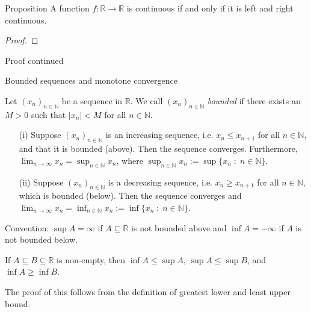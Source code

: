 \documentclass [aspectratio=169]{beamer}
\newcommand{\R}{{\mathbb{R}}}
\newcommand{\N}{{\mathbb{N}}}
\begin{document}
\begin{frame}
\begin{exampleblock}{Proposition}
 A function $f\colon \R \to \R$ is continuous if and only if it is left and right continuous. 
\end{exampleblock}
\begin{proof}
\vspace{5cm}
\end{proof}
\end{frame}


\begin{frame}
\begin{block}{Proof continued}
\vspace{4.5cm}
\end{block}
\end{frame}


\begin{frame}{Bounded sequences and monotone convergence}
\begin{definition}
Let $(x_n)_{n\in \N}$ be a sequence in $\R$. We call $(x_n)_{n\in \N}$ \emph{bounded} if there exists an $M > 0$ such that $\vert x_n\vert<M$ for all $n\in \N$.
\end{definition}

\vspace{0.5em}

\begin{theorem}
\begin{itemize}
\item[(i)] Suppose $(x_n)_{n\in \N}$ is an increasing sequence, i.e. $x_n\leq x_{n+1}$ for all $n\in \N$, and that it is bounded (above). Then the sequence converges. Furthermore, $\lim_{n\to \infty} x_n = \sup_{n\in \N} x_n$, where $\sup_{n\in \N} x_n := \sup\{x_n \; \colon \; n\in \N\}$.
\item[(ii)] Suppose $(x_n)_{n\in \N}$ is a decreasing sequence, i.e. $x_n\geq x_{n+1}$ for all $n\in \N$, which is bounded (below). Then the sequence converges and $\lim_{n\to \infty} x_n = \inf_{n\in \N} x_n := \inf\{x_n \; \colon \; n\in \N\}$. 
\end{itemize}
\end{theorem}

\end{frame}


\begin{frame}
Convention: $\sup A = \infty$ if $A\subseteq \R$ is not bounded above and $\inf A= -\infty$ if $A$ is not bounded below.

\begin{lemma}
If $A \subseteq B \subseteq \R$ is non-empty, then $\inf A \leq \sup A$, $\sup A \leq \sup B$, and $\inf A \geq \inf B$.
\end{lemma}
The proof of this follows from the definition of greatest lower and least upper bound. 

\end{frame}
\end{document}
